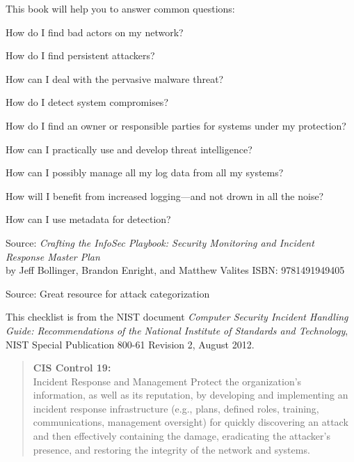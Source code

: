 \documentclass[Screen16to9,17pt]{foils}
\begin{document}
This book will help you to answer common questions:
\begin{list2}
\item How do I find bad actors on my network?
\item How do I find persistent attackers?
\item How can I deal with the pervasive malware threat?
\item How do I detect system compromises?
\item How do I find an owner or responsible parties for systems under my protection?
\item How can I practically use and develop threat intelligence?
\item How can I possibly manage all my log data from all my systems?
\item How will I benefit from increased logging—and not drown in all the noise?
\item How can I use metadata for detection?
\end{list2}
Source: \emph{Crafting the InfoSec Playbook: Security Monitoring and Incident Response Master Plan}\\
 by Jeff Bollinger, Brandon Enright, and Matthew Valites ISBN: 9781491949405




Source:  Great resource for attack categorization



This checklist is from the NIST document
\emph{Computer Security Incident Handling Guide: Recommendations of the National Institute
of Standards and Technology}, NIST Special Publication 800-61
Revision 2, August 2012.



\begin{quote}{\bf
CIS Control 19:}\\
Incident Response and Management Protect the organization’s information, as well as its reputation, by developing and implementing an incident response infrastructure (e.g., plans, defined roles, training, communications, management oversight) for quickly discovering an attack and then effectively containing the damage, eradicating the attacker’s presence, and restoring the integrity of the network and systems.
\end{quote}
\end{document}
